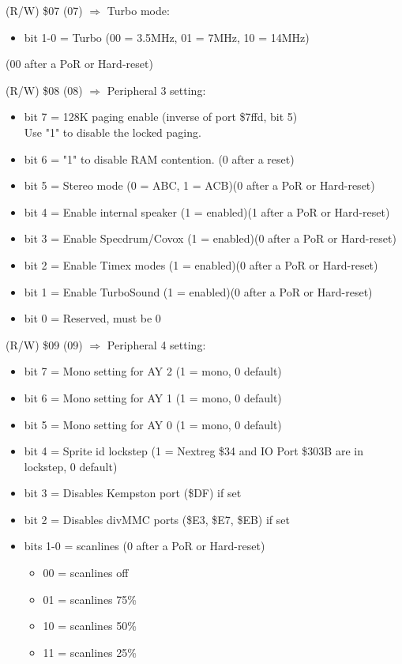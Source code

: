 (R/W) \$07 (07) $\Rightarrow$ Turbo mode:
\begin{itemize}
\item[] bit 1-0 = Turbo (00 = 3.5MHz, 01 = 7MHz, 10 = 14MHz)
\end{itemize}
(00 after a PoR or Hard-reset)

(R/W) \$08 (08) $\Rightarrow$ Peripheral 3 setting:
\begin{itemize}
\item[] bit 7 = 128K paging enable (inverse of port \$7ffd, bit 5)\\
  Use "1" to disable the locked paging.
\item[] bit 6 = "1" to disable RAM contention. (0 after a reset)
\item[] bit 5 = Stereo mode (0 = ABC, 1 = ACB)(0 after a PoR or Hard-reset)
\item[] bit 4 = Enable internal speaker (1 = enabled)(1 after a PoR or
  Hard-reset)
\item[] bit 3 = Enable Specdrum/Covox (1 = enabled)(0 after a PoR or
  Hard-reset)
\item[] bit 2 = Enable Timex modes (1 = enabled)(0 after a PoR or
  Hard-reset)
\item[] bit 1 = Enable TurboSound (1 = enabled)(0 after a PoR or
  Hard-reset)
\item[] bit 0 = Reserved, must be 0
\end{itemize}

(R/W) \$09 (09) $\Rightarrow$ Peripheral 4 setting:
\begin{itemize}
\item[] bit 7 = Mono setting for AY 2 (1 = mono, 0 default)
\item[] bit 6 = Mono setting for AY 1 (1 = mono, 0 default)
\item[] bit 5 = Mono setting for AY 0 (1 = mono, 0 default)
\item[] bit 4 = Sprite id lockstep (1 = Nextreg \$34 and IO Port
  \$303B are in lockstep, 0 default)
\item[] bit 3 = Disables Kempston port (\$DF) if set
\item[] bit 2 = Disables divMMC ports (\$E3, \$E7, \$EB) if set
\item[] bits 1-0 = scanlines (0 after a PoR or Hard-reset)
  \begin{itemize}
  \item[] 00 = scanlines off
  \item[] 01 = scanlines 75\%
  \item[] 10 = scanlines 50\%
  \item[] 11 = scanlines 25\%
  \end{itemize}
\end{itemize}

